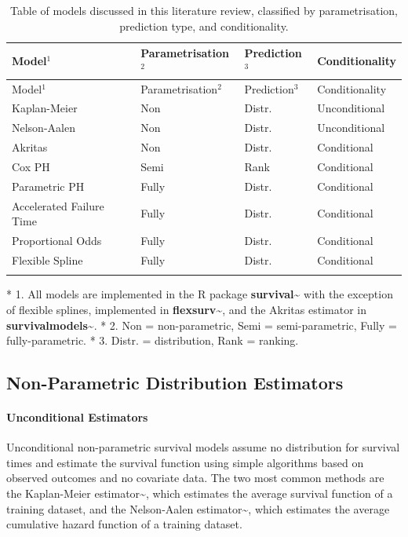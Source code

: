 \documentclass[
  letterpaper,
]{scrbook}
\let\oldparagraph\paragraph
\renewcommand{\paragraph}[1]{\oldparagraph{#1}\mbox{}}
\theoremstyle{plain}
\theoremstyle{definition}
\theoremstyle{remark}
\begin{document}
\hypertarget{tbl-surv-models}{}
\begin{longtable}[]{@{}llll@{}}
\toprule()
Model\(^1\) & Parametrisation\(^2\) & Prediction\(^3\) &
Conditionality \\
\midrule()
\endfirsthead
\toprule()
Model\(^1\) & Parametrisation\(^2\) & Prediction\(^3\) &
Conditionality \\
\midrule()
\endhead
Kaplan-Meier & Non & Distr. & Unconditional \\
Nelson-Aalen & Non & Distr. & Unconditional \\
Akritas & Non & Distr. & Conditional \\
Cox PH & Semi & Rank & Conditional \\
Parametric PH & Fully & Distr. & Conditional \\
Accelerated Failure Time & Fully & Distr. & Conditional \\
Proportional Odds & Fully & Distr. & Conditional \\
Flexible Spline & Fully & Distr. & Conditional \\
\bottomrule()
\caption{\label{tbl-surv-models}Table of models discussed in this
literature review, classified by parametrisation, prediction type, and
conditionality.}\tabularnewline
\end{longtable}

* 1. All models are implemented in the \textsf{R} package
\textbf{survival}\textasciitilde{}\cite{pkgsurvival} with the exception
of flexible splines, implemented in
\textbf{flexsurv}\textasciitilde{}\cite{pkgflexsurv}, and the Akritas
estimator in
\textbf{survivalmodels}\textasciitilde{}\cite{pkgsurvivalmodels}. * 2.
Non = non-parametric, Semi = semi-parametric, Fully = fully-parametric.
* 3. Distr. = distribution, Rank = ranking.

\subsection{Non-Parametric Distribution Estimators}
\label{sec:surv_models_uncond}

\paragraph{Unconditional Estimators}

Unconditional non-parametric survival models assume no distribution for
survival times and estimate the survival function using simple
algorithms based on observed outcomes and no covariate data. The two
most common methods are the Kaplan-Meier
estimator\textasciitilde{}\cite{KaplanMeier1958}, which estimates the
average survival function of a training dataset, and the Nelson-Aalen
estimator\textasciitilde{}\cite{Aalen1978, Nelson1972}, which estimates
the average cumulative hazard function of a training dataset.
\end{document}
